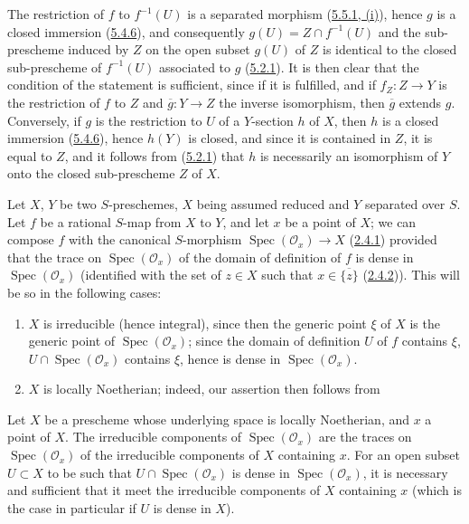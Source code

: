 The restriction of $f$ to $f^{-1}(U)$ is a separated morphism
(\hyperref[I.5.5.1]{5.5.1, (i)}), hence $g$ is a closed immersion
(\hyperref[I.5.4.6]{5.4.6}), and consequently
$g(U)=Z\cap f^{-1}(U)$ and the sub-prescheme induced by $Z$ on the open subset
$g(U)$ of $Z$ is identical to the closed sub-prescheme of $f^{-1}(U)$
associated to $g$ (\hyperref[I.5.2.1]{5.2.1}). It is then clear that the
condition of the statement is sufficient, since if it is fulfilled, and if
$f_Z:Z\to Y$ is the restriction of $f$ to $Z$ and $\overline g:Y\to Z$ the
inverse isomorphism, then $\overline g$ extends $g$. Conversely, if $g$ is the
restriction to $U$ of a $Y$-section $h$ of $X$, then $h$ is a closed immersion
(\hyperref[I.5.4.6]{5.4.6}), hence $h(Y)$ is closed, and since it is
contained in $Z$, it is equal to $Z$, and it follows from
(\hyperref[I.5.2.1]{5.2.1}) that $h$ is necessarily an isomorphism of
$Y$ onto the closed sub-prescheme $Z$ of $X$.

\begin{env}[7.2.8]
\label{I.7.2.8}
Let $X$, $Y$ be two $S$-preschemes, $X$ being assumed reduced and $Y$
separated over $S$. Let $f$ be a rational $S$-map from $X$ to $Y$, and let
$x$ be a point of $X$; we can compose $f$ with the canonical $S$-morphism
$\operatorname{Spec}(\mathscr{O}_x)\to X$
(\hyperref[I.2.4.1]{2.4.1}) provided that the trace on
$\operatorname{Spec}(\mathscr{O}_x)$ of the domain of definition of $f$ is
dense in $\operatorname{Spec}(\mathscr{O}_x)$ (identified with the set of
$z\in X$ such that $x\in\overline{\{z\}}$
(\hyperref[I.2.4.2]{2.4.2})). This will be so in the following cases:
\begin{enumerate}
  \item[1\textsuperscript{o}] $X$ is irreducible (hence integral), since then
    the generic point $\xi$ of $X$ is the generic point of
    $\operatorname{Spec}(\mathscr{O}_x)$; since the domain of definition $U$
    of $f$ contains $\xi$, $U\cap\operatorname{Spec}(\mathscr{O}_x)$ contains
    $\xi$, hence is dense in $\operatorname{Spec}(\mathscr{O}_x)$.
  \item[2\textsuperscript{o}] $X$ is locally Noetherian; indeed, our
    assertion then follows from
\end{enumerate}
\end{env}

\begin{lemma}[7.2.8.1]
\label{I.7.2.8.1}
Let $X$ be a prescheme whose underlying space is locally Noetherian, and
$x$ a point of $X$. The irreducible components of
$\operatorname{Spec}(\mathscr{O}_x)$ are the traces on
$\operatorname{Spec}(\mathscr{O}_x)$ of the irreducible components of $X$
containing $x$. For an open subset $U\subset X$ to be such that
$U\cap\operatorname{Spec}(\mathscr{O}_x)$ is dense in
$\operatorname{Spec}(\mathscr{O}_x)$, it is necessary and sufficient that it
meet the irreducible components of $X$ containing $x$ (which is the case in
particular if $U$ is dense in $X$).
\end{lemma}

